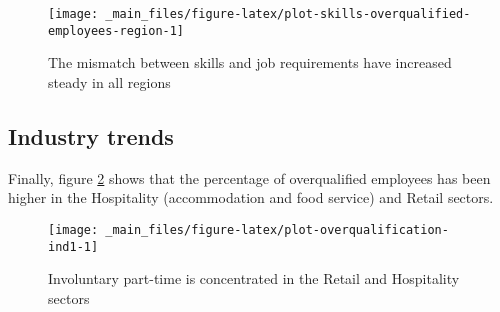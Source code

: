 \documentclass[
]{book}
\begin{document}
\begin{figure}

{\centering \texttt{[image: \_main\_files/figure-latex/plot-skills-overqualified-employees-region-1]} 

}

\caption{The mismatch between skills and job requirements have increased steady in all regions}\label{fig:plot-skills-overqualified-employees-region}
\end{figure}

\hypertarget{industry-trends-2}{%
\subsection{Industry trends}\label{industry-trends-2}}

Finally, figure \ref{fig:plot-overqualification-ind1} shows that the percentage of overqualified employees has been higher in the Hospitality (accommodation and food service) and Retail sectors.

\begin{figure}

{\centering \texttt{[image: \_main\_files/figure-latex/plot-overqualification-ind1-1]} 

}

\caption{Involuntary part-time is concentrated in the Retail and Hospitality sectors}\label{fig:plot-overqualification-ind1}
\end{figure}

  
\end{document}
